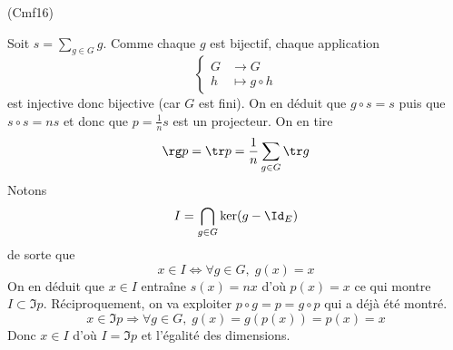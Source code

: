 \begin{tiny}(Cmf16)\end{tiny} Soit $s=\sum_{g\in G}g$. Comme chaque $g$ est bijectif, chaque application
\begin{displaymath}
 \left\lbrace 
\begin{aligned}
 G &\rightarrow G \\ h &\mapsto g\circ h
\end{aligned}
\right. 
\end{displaymath}
 est injective donc bijective (car $G$ est fini). On en déduit que $g\circ s = s$ puis que $s\circ s = n s$ et donc que $p=\frac{1}{n}s$ est un projecteur. On en tire
\begin{displaymath}
 \rg p = \tr p = \frac{1}{n}\sum_{g\in G}\tr g
\end{displaymath}
Notons
\begin{displaymath}
 I = \bigcap_{g\in G}\ker(g-\Id_E)
\end{displaymath}
de sorte que
\begin{displaymath}
 x\in I \Leftrightarrow \forall g\in G,\; g(x)=x
\end{displaymath}
On en déduit que $x\in I$  entraîne $s(x)=nx$ d'où $p(x)=x$ ce qui montre $I\subset \Im p$.\newline
Réciproquement, on va exploiter $p\circ g = p =g \circ p$ qui a déjà été montré.
\begin{displaymath}
 x\in \Im p \Rightarrow \forall g \in G,\; g(x)=g(p(x))=p(x)=x 
\end{displaymath}
Donc $ x \in I$ d'où $I=\Im p$ et l'égalité des dimensions.